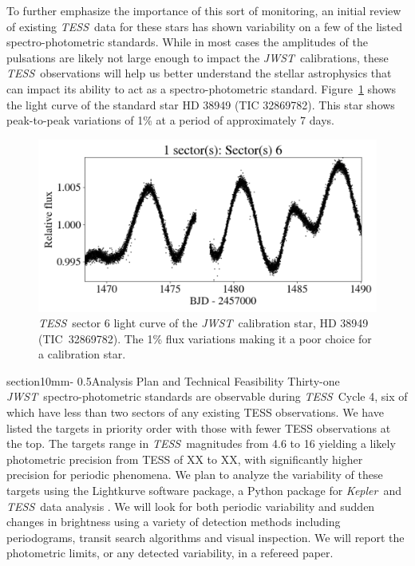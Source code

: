 \documentclass[letterpaper,12pt]{article}
\makeatletter
\renewcommand{\section}{\@startsection%
{section}{1}{0mm}{-\baselineskip}%
{0.5\baselineskip}{\normalfont\Large\bfseries}}%
\newcommand{\tess}{{\it TESS}}
\newcommand{\jwst}{{\it JWST}}
\newcommand{\kepler}{{\it Kepler}}
\makeatother
\begin{document}
To further emphasize the importance of this sort of monitoring, an initial review of existing \tess\ data for these stars has shown variability on a few of the listed spectro-photometric standards. While in most cases the amplitudes of the pulsations are likely not large enough to impact the \jwst\ calibrations, these \tess\ observations will help us better understand the stellar astrophysics that can impact its ability to act as a spectro-photometric standard. Figure~\ref{fig:lc} shows the light curve of the standard star HD 38949 (TIC 32869782). This star shows peak-to-peak variations of 1\% at a period of approximately 7 days.

\begin{figure}
    \centering
    \includegraphics[scale=.6]{HR38949_lc.png}
    \caption{\tess\ sector 6 light curve of the \jwst\ calibration star, HD 38949 (TIC~32869782). The 1\% flux variations making it a poor choice for a calibration star.}
    \label{fig:lc}
\end{figure}





\section{Analysis Plan and Technical Feasibility}
Thirty-one \jwst\ spectro-photometric standards are observable during \tess\ Cycle 4, six of which have less than two sectors of any existing TESS observations. We have listed the targets in priority order with those with fewer TESS observations at the top. The targets range in \tess\ magnitudes from 4.6 to 16 yielding a likely photometric precision from TESS of XX to XX, with significantly higher precision for periodic phenomena.  We plan to analyze the variability of these targets using the Lightkurve software package, a Python package for \kepler\ and \tess\ data analysis \citep{2018ascl.soft12013L}. We will look for both periodic variability and sudden changes in brightness using a variety of detection methods including periodograms, transit search algorithms and visual inspection. We will report the photometric limits, or any detected variability, in a refereed paper.
\end{document}
